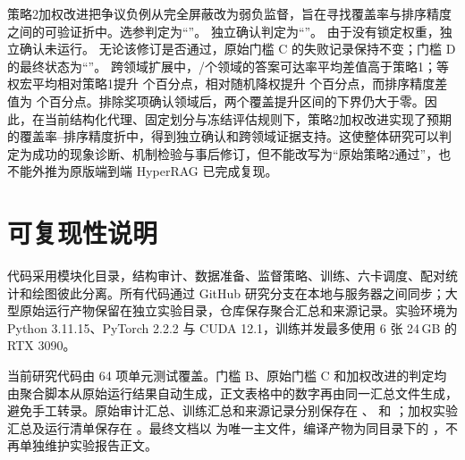 \documentclass[UTF8,11pt]{ctexart}
\begin{document}
策略2加权改进把争议负例从完全屏蔽改为弱负监督，旨在寻找覆盖率与排序精度之间的可验证折中。选参判定为“\WeightedSelectionDecision”。
\ifweightedconfirmationavailable
独立确认判定为“\WeightedConfirmationDecision”。
\else
由于没有锁定权重，独立确认未运行。
\fi
无论该修订是否通过，原始门槛 C 的失败记录保持不变；门槛 D 的最终状态为“\GateDAvailability”。
\ifgatedavailable
跨领域扩展中，\GateDPositiveDomainCount/\GateDDomainCount 个领域的答案可达率平均差值高于策略1；等权宏平均相对策略1提升 \GateDVsStrategyOne 个百分点，相对随机降权提升 \GateDVsRandomWeighted 个百分点，而排序精度差值为 \GateDPrecisionVsStrategyOne 个百分点。排除奖项确认领域后，两个覆盖提升区间的下界仍大于零。因此，在当前结构化代理、固定划分与冻结评估规则下，策略2加权改进实现了预期的覆盖率--排序精度折中，得到独立确认和跨领域证据支持。这使整体研究可以判定为成功的现象诊断、机制检验与事后修订，但不能改写为“原始策略2通过”，也不能外推为原版端到端 HyperRAG 已完成复现。
\fi

\section*{可复现性说明}

代码采用模块化目录，结构审计、数据准备、监督策略、训练、六卡调度、配对统计和绘图彼此分离。所有代码通过 GitHub 研究分支在本地与服务器之间同步；大型原始运行产物保留在独立实验目录，仓库保存聚合汇总和来源记录。实验环境为 Python 3.11.15、PyTorch 2.2.2 与 CUDA 12.1，训练并发最多使用 6 张 24\,GB 的 RTX 3090。

当前研究代码由 64 项单元测试覆盖。门槛 B、原始门槛 C 和加权改进的判定均由聚合脚本从原始运行结果自动生成，正文表格中的数字再由同一汇总文件生成，避免手工转录。原始审计汇总、训练汇总和来源记录分别保存在 、 和 ；加权实验汇总及运行清单保存在 。最终文档以  为唯一主文件，编译产物为同目录下的 ，不再单独维护实验报告正文。

\begingroup
\scriptsize


\endgroup
\end{document}
